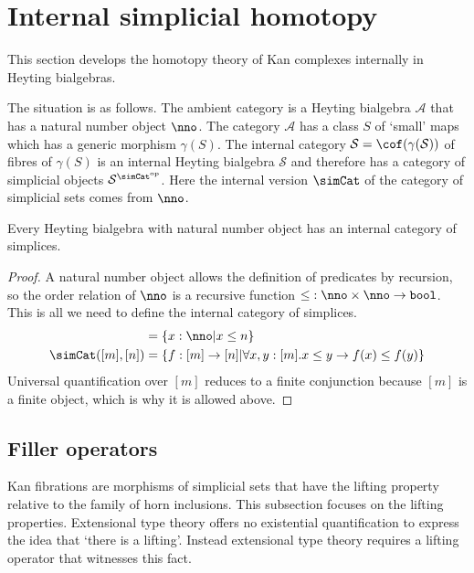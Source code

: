 \documentclass{tac}
\newcommand\hide[1]{}
\newcommand\cat\mathcal
\newcommand\set[1]{\left\{#1\right\}}
\newcommand\dual{^{\mathrm{op}}}
\newcommand\s{^{\simCat\dual}}
\newcommand\of{:}
\newcommand\gen\gamma
\newcommand\bool{\mathtt{bool}}
\begin{document}
\hide{
Move stuff on discrete isofibrations here?

It is better to replace discrete isofibrations with $\cat S$-valued predicates or similar. We should use those throughout.

}

\section{Internal simplicial homotopy}
This section develops the homotopy theory of Kan complexes internally in Heyting bialgebras. 

The situation is as follows. The ambient category is a Heyting bialgebra $\cat A$ that has a natural number object $\nno$. The category $\cat A$ has a class $S$ of `small' maps which has a generic morphism $\gen(S)$. The internal category $\cat S = \cof(\gen(\cat S))$ of fibres of $\gen(S)$ is an internal Heyting bialgebra $\cat S$ and therefore has a category of simplicial objects $\cat S\s$. Here the internal version $\simCat$ of the category of simplicial sets comes from $\nno$.

\begin{proposition} Every Heyting bialgebra with natural number object has an internal category of simplices.\end{proposition}

\begin{proof} A natural number object allows the definition of predicates by recursion, so the order relation of $\nno$ is a recursive function $\mathord\leq\of\nno\times \nno \to \bool$. This is all we need to define the internal category of simplices.
\begin{align*}
[n] &= \set{x\of\nno\middle| x\leq n}\\
\simCat([m],[n]) &= \set{f\of[m]\to[n]\middle|\forall x,y\of [m].x\leq y\to f(x)\leq f(y)}
\end{align*}
Universal quantification over $[m]$ reduces to a finite conjunction because $[m]$ is a finite object, which is why it is allowed above. 
\end{proof}

\subsection{Filler operators}
Kan fibrations are morphisms of simplicial sets that have the lifting property relative to the family of horn inclusions. This subsection focuses on the lifting properties. Extensional type theory offers no existential quantification to express the idea that `there is a lifting'. Instead extensional type theory requires a lifting operator that witnesses this fact.
\end{document}
